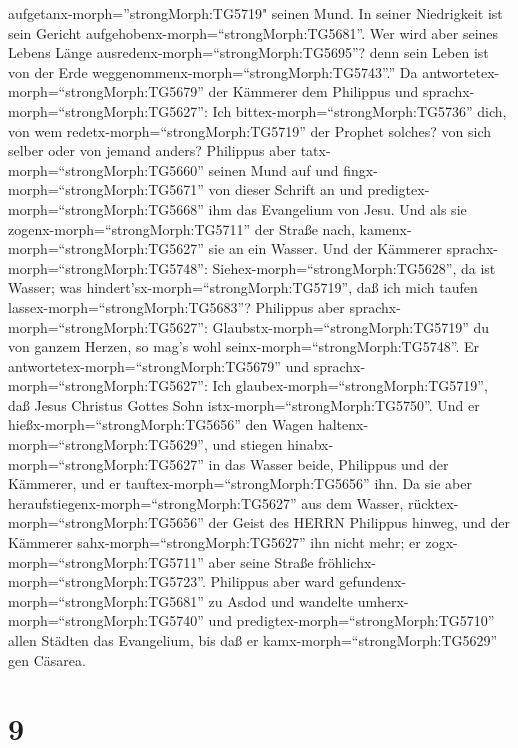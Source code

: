 aufgetanx-morph=''strongMorph:TG5719" seinen Mund.  In
seiner Niedrigkeit ist sein Gericht
aufgehobenx-morph=``strongMorph:TG5681''. Wer wird aber seines Lebens
Länge ausredenx-morph=``strongMorph:TG5695''? denn sein Leben ist von
der Erde weggenommenx-morph=``strongMorph:TG5743''.''  Da
antwortetex-morph=``strongMorph:TG5679'' der Kämmerer dem Philippus und
sprachx-morph=``strongMorph:TG5627'': Ich
bittex-morph=``strongMorph:TG5736'' dich, von wem
redetx-morph=``strongMorph:TG5719'' der Prophet solches? von sich selber
oder von jemand anders?  Philippus aber
tatx-morph=``strongMorph:TG5660'' seinen Mund auf und
fingx-morph=``strongMorph:TG5671'' von dieser Schrift an und
predigtex-morph=``strongMorph:TG5668'' ihm das Evangelium von Jesu.
 Und als sie zogenx-morph=``strongMorph:TG5711'' der Straße
nach, kamenx-morph=``strongMorph:TG5627'' sie an ein Wasser. Und der
Kämmerer sprachx-morph=``strongMorph:TG5748'':
Siehex-morph=``strongMorph:TG5628'', da ist Wasser; was
hindert'sx-morph=``strongMorph:TG5719'', daß ich mich taufen
lassex-morph=``strongMorph:TG5683''?  Philippus aber
sprachx-morph=``strongMorph:TG5627'':
Glaubstx-morph=``strongMorph:TG5719'' du von ganzem Herzen, so mag's
wohl seinx-morph=``strongMorph:TG5748''. Er
antwortetex-morph=``strongMorph:TG5679'' und
sprachx-morph=``strongMorph:TG5627'': Ich
glaubex-morph=``strongMorph:TG5719'', daß Jesus Christus Gottes Sohn
istx-morph=``strongMorph:TG5750''.  Und er
hießx-morph=``strongMorph:TG5656'' den Wagen
haltenx-morph=``strongMorph:TG5629'', und stiegen
hinabx-morph=``strongMorph:TG5627'' in das Wasser beide, Philippus und
der Kämmerer, und er tauftex-morph=``strongMorph:TG5656'' ihn.
 Da sie aber heraufstiegenx-morph=``strongMorph:TG5627''
aus dem Wasser, rücktex-morph=``strongMorph:TG5656'' der Geist des HERRN
Philippus hinweg, und der Kämmerer sahx-morph=``strongMorph:TG5627'' ihn
nicht mehr; er zogx-morph=``strongMorph:TG5711'' aber seine Straße
fröhlichx-morph=``strongMorph:TG5723''.  Philippus aber
ward gefundenx-morph=``strongMorph:TG5681'' zu Asdod und wandelte
umherx-morph=``strongMorph:TG5740'' und
predigtex-morph=``strongMorph:TG5710'' allen Städten das Evangelium, bis
daß er kamx-morph=``strongMorph:TG5629'' gen Cäsarea.

\hypertarget{section-8}{%
\section{9}\label{section-8}}

